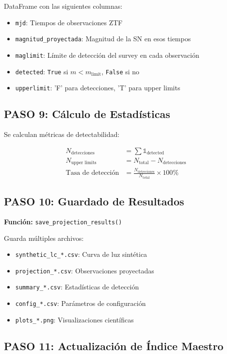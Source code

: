 \documentclass[11pt,a4paper]{article}
\begin{document}
DataFrame con las siguientes columnas:
\begin{itemize}
    \item \texttt{mjd}: Tiempos de observaciones ZTF
    \item \texttt{magnitud\_proyectada}: Magnitud de la SN en esos tiempos
    \item \texttt{maglimit}: Límite de detección del survey en cada observación
    \item \texttt{detected}: \texttt{True} si $m < m_{\text{limit}}$, \texttt{False} si no
    \item \texttt{upperlimit}: 'F' para detecciones, 'T' para upper limits
\end{itemize}

\subsection{PASO 9: Cálculo de Estadísticas}

Se calculan métricas de detectabilidad:

\begin{align}
N_{\text{detecciones}} &= \sum \mathbb{1}_{\text{detected}} \\
N_{\text{upper limits}} &= N_{\text{total}} - N_{\text{detecciones}} \\
\text{Tasa de detección} &= \frac{N_{\text{detecciones}}}{N_{\text{total}}} \times 100\%
\end{align}

\subsection{PASO 10: Guardado de Resultados}

\textbf{Función:} \texttt{save\_projection\_results()}

Guarda múltiples archivos:
\begin{itemize}
    \item \texttt{synthetic\_lc\_*.csv}: Curva de luz sintética
    \item \texttt{projection\_*.csv}: Observaciones proyectadas
    \item \texttt{summary\_*.csv}: Estadísticas de detección
    \item \texttt{config\_*.csv}: Parámetros de configuración
    \item \texttt{plots\_*.png}: Visualizaciones científicas
\end{itemize}

\subsection{PASO 11: Actualización de Índice Maestro}
\end{document}
